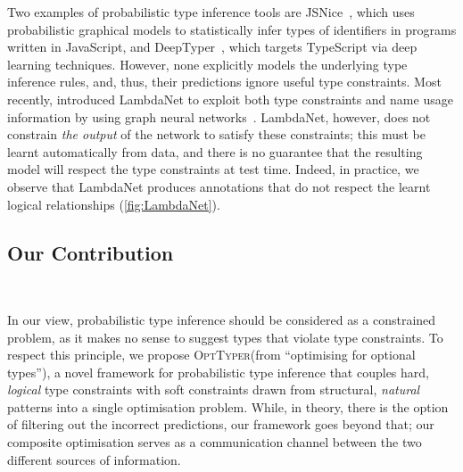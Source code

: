 \documentclass[acmsmall, review, anonymous]{acmart}\settopmatter{printfolios=true,printccs=false,printacmref=false}
\newcommand{\projectname}{\textsc{OptTyper}\xspace}
\begin{document}
Two examples of probabilistic type inference tools are JSNice~\cite{raychev15},
which uses probabilistic graphical models to statistically infer types of identifiers
in programs written in JavaScript,
and DeepTyper~\cite{hellendoorn18}, which targets TypeScript via deep learning techniques.
However, none explicitly models the underlying
type inference rules, and, thus, their predictions ignore useful type constraints.
%
Most recently, \citet{wei20} introduced LambdaNet to exploit both type constraints and name usage information by using graph neural networks~\citep{allamanis17}. LambdaNet, however, does not constrain 
\emph{the output} of the network to satisfy these constraints;
this must be learnt automatically from data,
and there is no guarantee that the resulting model will respect the type constraints at test time. 
Indeed, in practice, we observe that LambdaNet
produces annotations that do not respect the learnt 
logical relationships (\cref{fig:LambdaNet}).


\subsection{Our Contribution}~\label{}

In our view, probabilistic type inference should be considered as a constrained problem, as it makes no sense to suggest types that violate type constraints. To respect this principle, we propose \projectname (from ``optimising for optional types''), a novel framework for probabilistic type inference that couples hard, \textit{logical} type constraints with soft constraints drawn from structural, \textit{natural} patterns into a single optimisation problem. While, in theory, there is the option of filtering out the incorrect predictions, our framework goes beyond that; our composite optimisation serves as a communication channel between the two different sources of information. 

\end{document}
